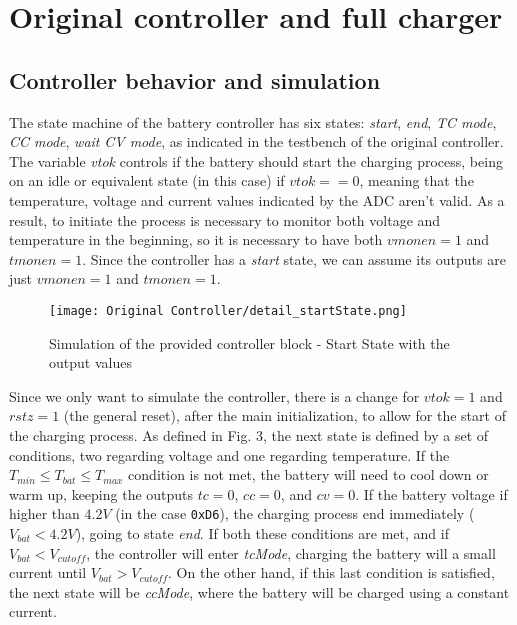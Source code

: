 \documentclass[12pt]{article}
\begin{document}
\tableofcontents
\newpage


\section{Original controller and full charger}
\subsection{Controller behavior and simulation}

The state machine of the battery controller has six states: \textit{start}, \textit{end}, \textit{TC mode}, \textit{CC mode}, \textit{wait} \textit{CV mode}, as indicated in the testbench of the original controller. The variable \textit{vtok} controls if the battery should start the charging process, being on an idle or equivalent state (in this case) if $vtok == 0$, meaning that the temperature, voltage and current values indicated by the ADC aren't valid. As a result, to initiate the process is necessary to monitor both voltage and temperature in the beginning, so it is necessary to have both $vmonen=1$ and $tmonen=1$. Since the controller has a \textit{start} state, we can assume its outputs are just $vmonen=1$ and $tmonen=1$.

\begin{figure}[H]
    \centering 
    \texttt{[image: Original Controller/detail\_startState.png]}
    \caption{Simulation of the provided controller block - Start State with the output values}
    \label{fig:orig_ctr_start}
\end{figure}

Since we only want to simulate the controller, there is a change for $vtok=1$ and $rstz=1$ (the general reset), after the main initialization, to allow for the start of the charging process. As defined in Fig. 3\cite{batchargerPaper}, the next state is defined by a set of conditions, two regarding voltage and one regarding temperature. If the $T_{min}\leq T_{bat}\leq T_{max}$ condition is not met, the battery will need to cool down or warm up, keeping the outputs $tc=0$, $cc=0$, and $cv=0$. If the battery voltage if higher than $4.2V$ (in the case \texttt{0xD6}), the charging process end immediately ($V_{bat}<4.2V$), going to state \textit{end}. If both these conditions are met, and if $V_{bat}<V_{cutoff}$, the controller will enter \textit{tcMode}, charging the battery will a small current until $V_{bat}>V_{cutoff}$. On the other hand, if this last condition is satisfied, the next state will be \textit{ccMode}, where the battery will be charged using a constant current. 
\end{document}

